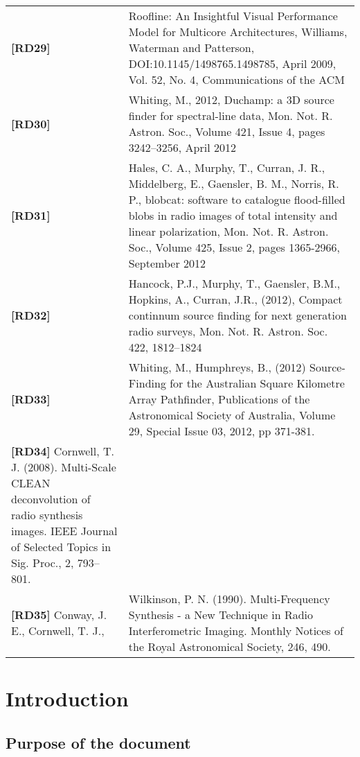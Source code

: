 \documentclass[11pt,a4paper]{article}
\begin{document}
\begin{center}
{\begin{tabularx}{\textwidth}{|l|X|}
    {\bf [RD29]} & Roofline: An Insightful Visual Performance Model for
    Multicore Architectures, Williams, Waterman and Patterson,
    DOI:10.1145/1498765.1498785, April 2009, Vol. 52, No. 4, Communications of
    the ACM\\
    {\bf [RD30]} & Whiting, M., 2012, Duchamp: a 3D source finder for spectral-line data, Mon. Not. R. Astron. Soc., Volume 421, Issue 4,  pages 3242–3256, April 2012 \\
    {\bf [RD31]} & Hales, C. A., Murphy, T., Curran, J. R., Middelberg, E., Gaensler, B. M., Norris, R. P., blobcat: software to catalogue flood-filled blobs in radio images of total intensity and linear polarization, Mon. Not. R. Astron. Soc., Volume 425,  Issue 2, pages 1365-2966, September 2012\\
    {\bf [RD32]} & Hancock, P.J., Murphy, T., Gaensler, B.M., Hopkins, A.,
    Curran, J.R., (2012), Compact continnum source finding for next generation
    radio surveys, Mon. Not. R. Astron. Soc. 422, 1812–1824\\
   {\bf [RD33]} & Whiting, M.,  Humphreys, B., (2012) Source-Finding for the
   Australian Square Kilometre Array Pathfinder, Publications of the
   Astronomical Society of Australia, Volume 29, Special Issue 03, 2012,
   pp 371-381.\\
   {\bf [RD34]} Cornwell, T. J. (2008). Multi-Scale CLEAN deconvolution of radio synthesis images. IEEE Journal of Selected Topics in Sig. Proc., 2, 793–801.\\
   {\bf [RD35]} Conway, J. E., Cornwell, T. J., & Wilkinson, P. N. (1990). Multi-Frequency Synthesis - a New Technique in Radio Interferometric Imaging. Monthly Notices of the Royal Astronomical Society, 246, 490.\\
   
   \hline
 \end{tabularx}}
\end{center}







\newpage
\section{Introduction}

\subsection{Purpose of the document}
\end{document}
